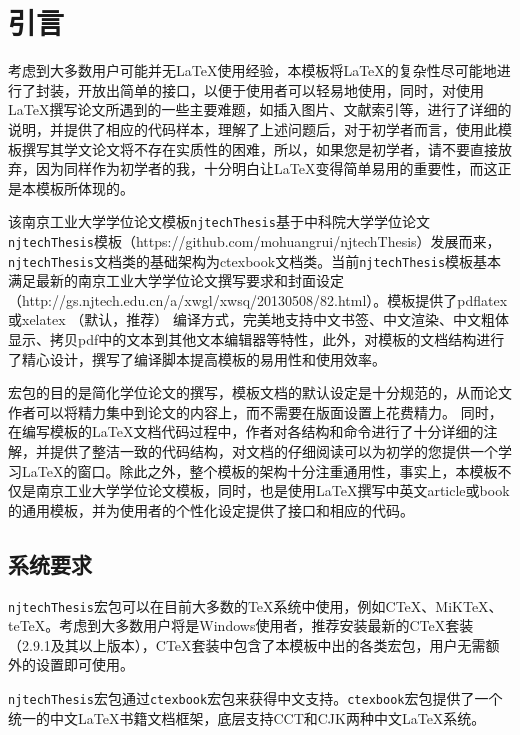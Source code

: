 
\chapter{引言}
\label{chap:introduction}

考虑到大多数用户可能并无\LaTeX{}使用经验，本模板将\LaTeX{}的复杂性尽可能地进行了封装，开放出简单的接口，以便于使用者可以轻易地使用，同时，对使用\LaTeX{}撰写论文所遇到的一些主要难题，如插入图片、文献索引等，进行了详细的说明，并提供了相应的代码样本，理解了上述问题后，对于初学者而言，使用此模板撰写其学文论文将不存在实质性的困难，所以，如果您是初学者，请不要直接放弃，因为同样作为初学者的我，十分明白让\LaTeX{}变得简单易用的重要性，而这正是本模板所体现的。

该南京工业大学学位论文模板\texttt{njtechThesis}基于中科院大学学位论文\texttt{njtechThesis}模板（https://github.com/mohuangrui/njtechThesis）发展而来，\texttt{njtechThesis}文档类的基础架构为ctexbook文档类。当前\texttt{njtechThesis}模板基本满足最新的南京工业大学学位论文撰写要求和封面设定（http://gs.njtech.edu.cn/a/xwgl/xwsq/20130508/82.html）。模板提供了pdflatex 或xelatex （默认，推荐） 编译方式，完美地支持中文书签、中文渲染、中文粗体显示、拷贝pdf中的文本到其他文本编辑器等特性，此外，对模板的文档结构进行了精心设计，撰写了编译脚本提高模板的易用性和使用效率。

宏包的目的是简化学位论文的撰写，模板文档的默认设定是十分规范的，从而论文作者可以将精力集中到论文的内容上，而不需要在版面设置上花费精力。 同时，在编写模板的\LaTeX{}文档代码过程中，作者对各结构和命令进行了十分详细的注解，并提供了整洁一致的代码结构，对文档的仔细阅读可以为初学的您提供一个学习\LaTeX{}的窗口。除此之外，整个模板的架构十分注重通用性，事实上，本模板不仅是南京工业大学学位论文模板，同时，也是使用\LaTeX{}撰写中英文article或book的通用模板，并为使用者的个性化设定提供了接口和相应的代码。

\section{系统要求}
\label{sec:sysRequire}

\texttt{njtechThesis}宏包可以在目前大多数的\TeX{}系统中使用，例如C\TeX{}、MiK\TeX{}、te\TeX{}。考虑到大多数用户将是Windows使用者，推荐安装最新的C\TeX{}套装（2.9.1及其以上版本），C\TeX{}套装中包含了本模板中出的各类宏包，用户无需额外的设置即可使用。

\texttt{njtechThesis}宏包通过\texttt{ctexbook}宏包来获得中文支持。\texttt{ctexbook}宏包提供了一个统一的中文\LaTeX{}书籍文档框架，底层支持CCT和CJK两种中文\LaTeX{}系统。

